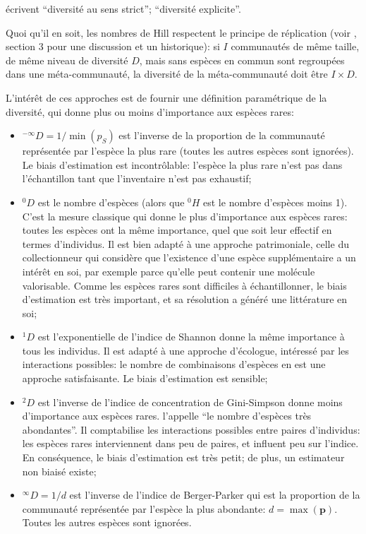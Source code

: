 \documentclass[
  11pt,
  french,
  a4paper,
  extrafontsizes,onecolumn,openright
  ]{memoir}
\providecommand{\tightlist}{%
  \setlength{\itemsep}{0pt}\setlength{\parskip}{0pt}}
\begin{document}
\textcite{Dauby2012} écrivent \enquote{diversité au sens strict}; \textcite{Gregorius2010} \enquote{diversité explicite}.

Quoi qu'il en soit, les nombres de Hill respectent le principe de réplication (voir \textcite{Chao2010}, section 3 pour une discussion et un historique): si \(I\) communautés de même taille, de même niveau de diversité \(D\), mais sans espèces en commun sont regroupées dans une méta-communauté, la diversité de la méta-communauté doit être \(I\times D\).

L'intérêt de ces approches est de fournir une définition paramétrique de la diversité, qui donne plus ou moins d'importance aux espèces rares:

\begin{itemize}
\tightlist
\item
  \(^{-\infty}\!D={1}/{\min(p_S)}\) est l'inverse de la proportion de la communauté représentée par l'espèce la plus rare (toutes les autres espèces sont ignorées).
  Le biais d'estimation est incontrôlable: l'espèce la plus rare n'est pas dans l'échantillon tant que l'inventaire n'est pas exhaustif;
\item
  \(^{0}\!D\) est le nombre d'espèces (alors que \(^{0}\!H\) est le nombre d'espèces moins 1). C'est la mesure classique qui donne le plus d'importance aux espèces rares: toutes les espèces ont la même importance, quel que soit leur effectif en termes d'individus.
  Il est bien adapté à une approche patrimoniale, celle du collectionneur qui considère que l'existence d'une espèce supplémentaire a un intérêt en soi, par exemple parce qu'elle peut contenir une molécule valorisable.
  Comme les espèces rares sont difficiles à échantillonner, le biais d'estimation est très important, et sa résolution a généré une littérature en soi;
\item
  \(^{1}\!D\) est l'exponentielle de l'indice de Shannon donne la même importance à tous les individus.
  Il est adapté à une approche d'écologue, intéressé par les interactions possibles: le nombre de combinaisons d'espèces en est une approche satisfaisante.
  Le biais d'estimation est sensible;
\item
  \(^{2}\!D\) est l'inverse de l'indice de concentration de Gini-Simpson donne moins d'importance aux espèces rares.
  \textcite{Hill1973} l'appelle \enquote{le nombre d'espèces très abondantes}.
  Il comptabilise les interactions possibles entre paires d'individus: les espèces rares interviennent dans peu de paires, et influent peu sur l'indice.
  En conséquence, le biais d'estimation est très petit; de plus, un estimateur non biaisé existe;
\item
  \(^{\infty}\!D={1}/{d}\) est l'inverse de l'indice de Berger-Parker \autocite{Berger1970} qui est la proportion de la communauté représentée par l'espèce la plus abondante: \(d=\max(\mathbf{p})\).
  Toutes les autres espèces sont ignorées.
\end{itemize}
\end{document}

